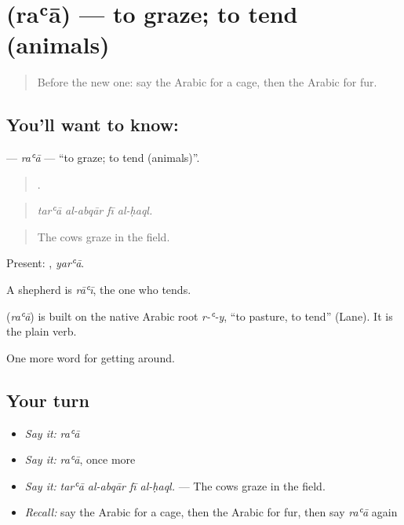\section[\texorpdfstring{\ar{رعى} (raʿā)}{رعى (raʿā)}]{ (raʿā) — to graze; to tend (animals)}

\label{lesson:AR-C478-raa}



\begin{quote}
Before the new one: say the Arabic for a cage, then the Arabic for fur.
\end{quote}

\subsection*{You'll want to know: }
\textbf{} — \emph{raʿā} — \textquotedblleft{}to graze; to tend (animals)\textquotedblright{}.

\begin{quote}
   .
\end{quote}

\begin{quote}
\emph{tarʿā al-abqār fī al-ḥaql.}
\end{quote}

\begin{quote}
The cows graze in the field.
\end{quote}

Present: , \emph{yarʿā}.

A shepherd is \emph{rāʿī}, the one who tends.

\begin{cousinweb}
\textbf{} (\emph{raʿā}) is built on the native Arabic root \emph{r-ʿ-y}, \textquotedblleft{}to pasture, to tend\textquotedblright{} (Lane). It is the plain verb.
\end{cousinweb}

\begin{grammarlens}[title={What you've built}]
One more word for getting around.
\end{grammarlens}

\subsection*{Your turn}
\begin{itemize}
\raggedright
  \item \emph{Say it:} \emph{raʿā}
  \item \emph{Say it:} \emph{raʿā}, once more
  \item \emph{Say it:} \emph{tarʿā al-abqār fī al-ḥaql.} — The cows graze in the field.
  \item \emph{Recall:} say the Arabic for a cage, then the Arabic for fur, then say \emph{raʿā} again
\end{itemize}

